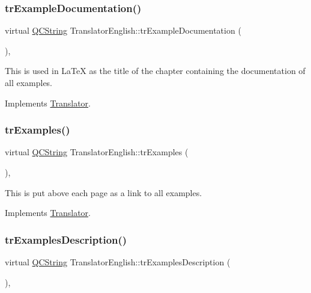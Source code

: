 \subsubsection{\texorpdfstring{trExampleDocumentation()}{trExampleDocumentation()}}
{\footnotesize\ttfamily virtual \mbox{\hyperlink{class_q_c_string}{Q\+C\+String}} Translator\+English\+::tr\+Example\+Documentation (\begin{DoxyParamCaption}{ }\end{DoxyParamCaption})\hspace{0.3cm}{\ttfamily [inline]}, {\ttfamily [virtual]}}

This is used in La\+TeX as the title of the chapter containing the documentation of all examples. 

Implements \mbox{\hyperlink{class_translator}{Translator}}.

\mbox{\label{class_translator_english_a1149e6cf06f2018c15171e7b38bfea84}} 
\subsubsection{\texorpdfstring{trExamples()}{trExamples()}}
{\footnotesize\ttfamily virtual \mbox{\hyperlink{class_q_c_string}{Q\+C\+String}} Translator\+English\+::tr\+Examples (\begin{DoxyParamCaption}{ }\end{DoxyParamCaption})\hspace{0.3cm}{\ttfamily [inline]}, {\ttfamily [virtual]}}

This is put above each page as a link to all examples. 

Implements \mbox{\hyperlink{class_translator}{Translator}}.

\mbox{\label{class_translator_english_aa05d38ec4f9bbca3f3eb5fa60b0236f3}} 
\subsubsection{\texorpdfstring{trExamplesDescription()}{trExamplesDescription()}}
{\footnotesize\ttfamily virtual \mbox{\hyperlink{class_q_c_string}{Q\+C\+String}} Translator\+English\+::tr\+Examples\+Description (\begin{DoxyParamCaption}{ }\end{DoxyParamCaption})\hspace{0.3cm}{\ttfamily [inline]}, {\ttfamily [virtual]}}

